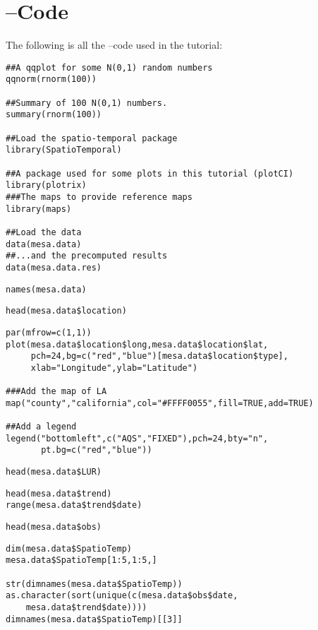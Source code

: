 \section{--Code} \label{app:R_code}
The following is all the --code used in the tutorial:

\begin{verbatim}
##A qqplot for some N(0,1) random numbers
qqnorm(rnorm(100))

##Summary of 100 N(0,1) numbers.
summary(rnorm(100))

##Load the spatio-temporal package
library(SpatioTemporal)

##A package used for some plots in this tutorial (plotCI)
library(plotrix) 
###The maps to provide reference maps
library(maps)

##Load the data
data(mesa.data)
##...and the precomputed results
data(mesa.data.res)
\end{verbatim}
\begin{verbatim}
names(mesa.data)
\end{verbatim}
\begin{verbatim}
head(mesa.data$location)
\end{verbatim}
%
\vspace*{-1\baselineskip}
\begin{verbatim}
par(mfrow=c(1,1))
plot(mesa.data$location$long,mesa.data$location$lat,
     pch=24,bg=c("red","blue")[mesa.data$location$type],
     xlab="Longitude",ylab="Latitude")

###Add the map of LA
map("county","california",col="#FFFF0055",fill=TRUE,add=TRUE)

##Add a legend
legend("bottomleft",c("AQS","FIXED"),pch=24,bty="n",
       pt.bg=c("red","blue"))
\end{verbatim}
\begin{verbatim}
head(mesa.data$LUR)
\end{verbatim}
\begin{verbatim}
head(mesa.data$trend)
range(mesa.data$trend$date)
\end{verbatim}
\begin{verbatim}
head(mesa.data$obs)
\end{verbatim}
\begin{verbatim}
dim(mesa.data$SpatioTemp)
mesa.data$SpatioTemp[1:5,1:5,]

str(dimnames(mesa.data$SpatioTemp))
as.character(sort(unique(c(mesa.data$obs$date,
    mesa.data$trend$date))))
dimnames(mesa.data$SpatioTemp)[[3]]
\end{verbatim}
